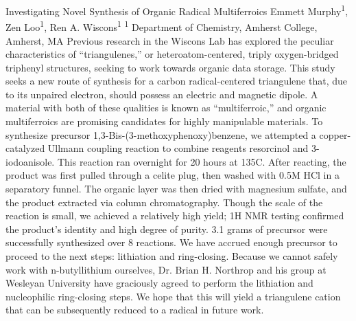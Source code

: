 \makeabstract
    {
    Investigating Novel Synthesis of Organic Radical Multiferroics
    }
    {
    Emmett Murphy\textsuperscript{1}, Zen Loo\textsuperscript{1}, Ren A. Wiscons\textsuperscript{1}
    }
    {
    \textsuperscript{1} Department of Chemistry, Amherst College, Amherst, MA
    }
    {
    Previous research in the Wiscons Lab has explored the peculiar characteristics of ``triangulenes,'' or heteroatom-centered, triply oxygen-bridged triphenyl structures, seeking to work towards organic data storage. This study seeks a new route of synthesis for a carbon radical-centered triangulene that, due to its unpaired electron, should possess an electric and magnetic dipole. A material with both of these qualities is known as ``multiferroic,'' and organic multiferroics are promising candidates for highly manipulable materials.
    }
    {
    To synthesize precursor 1,3-Bis-(3-methoxyphenoxy)benzene, we attempted a copper-catalyzed Ullmann coupling reaction to combine reagents resorcinol and 3-iodoanisole. This reaction ran overnight for 20 hours at 135{\textdegree}C. After reacting, the product was first pulled through a celite plug, then washed with 0.5M HCl in a separatory funnel. The organic layer was then dried with magnesium sulfate, and the product extracted via column chromatography.
    }
    {
    Though the scale of the reaction is small, we achieved a relatively high yield; 1H NMR testing confirmed the product's identity and high degree of purity. 3.1 grams of precursor were successfully synthesized over 8 reactions.
    }
    {
    We have accrued enough precursor to proceed to the next steps: lithiation and ring-closing. Because we cannot safely work with n-butyllithium ourselves, Dr. Brian H. Northrop and his group at Wesleyan University have graciously agreed to perform the lithiation and nucleophilic ring-closing steps. We hope that this will yield a triangulene cation that can be subsequently reduced to a radical in future work.
    }

    \newpage
    
